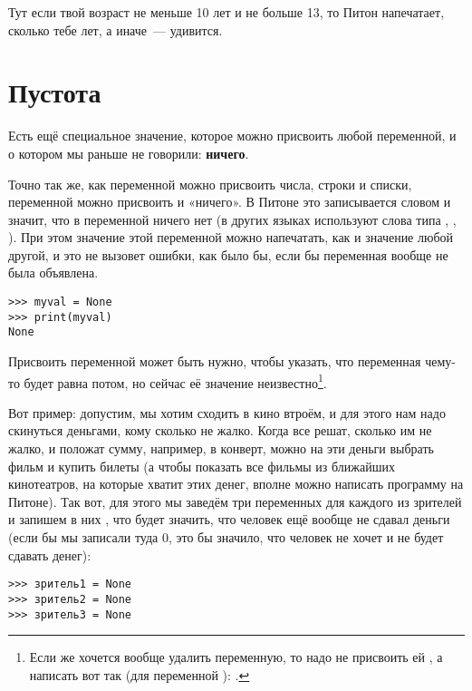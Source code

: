 Тут если твой возраст не меньше 10 лет и не больше 13, то Питон напечатает, сколько тебе лет, а иначе — удивится.

\section{Пустота}

Есть ещё специальное значение, которое можно присвоить любой переменной, и о котором мы раньше не говорили: \textbf{ничего}.

Точно так же, как переменной можно присвоить числа, строки и списки, переменной можно присвоить и «ничего». В Питоне это записывается словом  и значит, что в переменной ничего нет (в других языках используют слова типа , , ). При этом значение этой переменной можно напечатать, как и значение любой другой, и это не вызовет ошибки, как было бы, если бы переменная вообще не была объявлена.

\begin{listing}
\begin{verbatim}
>>> myval = None
>>> print(myval)
None
\end{verbatim}
\end{listing}

Присвоить переменной  может быть нужно, чтобы указать, что переменная чему-то будет равна потом, но сейчас её значение неизвестно\footnote{Если же хочется вообще удалить переменную, то надо не присвоить ей , а написать вот так (для переменной ): .}.

Вот пример: допустим, мы хотим сходить в кино втроём, и для этого нам надо скинуться деньгами, кому сколько не жалко. Когда все решат, сколько им не жалко, и положат сумму, например, в конверт, можно на эти деньги выбрать фильм и купить билеты (а чтобы показать все фильмы из ближайших кинотеатров, на которые хватит этих денег, вполне можно написать программу на Питоне). Так вот, для этого мы заведём три переменных для каждого из зрителей и запишем в них , что будет значить, что человек ещё вообще не сдавал деньги (если бы мы записали туда 0, это бы значило, что человек не хочет и не будет сдавать денег):

\begin{listing}
\begin{verbatim}
>>> зритель1 = None
>>> зритель2 = None
>>> зритель3 = None
\end{verbatim}
\end{listing}

